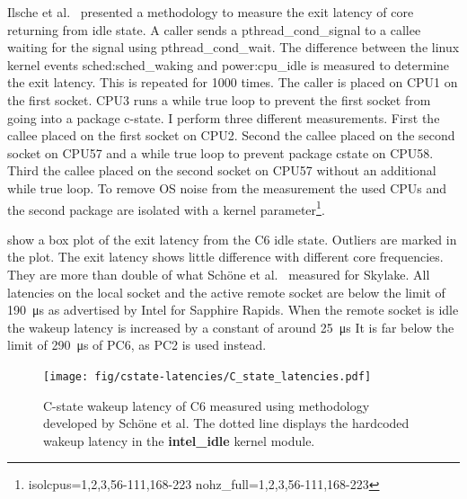 Ilsche et al.~\cite{Ilsche_2018_cstate} presented a methodology to measure the exit latency of core returning from idle state.
A caller sends a pthread\_cond\_signal to a callee waiting for the signal using pthread\_cond\_wait.
The difference between the linux kernel events sched:sched\_waking and power:cpu\_idle is measured to determine the exit latency.
This is repeated for \SI{1000}{} times.
The caller is placed on CPU1 on the first socket.
CPU3 runs a while true loop to prevent the first socket from going into a package c-state.
I perform three different measurements.
First the callee placed on the first socket on CPU2.
Second the callee placed on the second socket on CPU57 and a while true loop to prevent package cstate on CPU58.
Third the callee placed on the second socket on CPU57 without an additional while true loop.
To remove OS noise from the measurement the used CPUs and the second package are isolated with a kernel parameter\footnote{isolcpus=1,2,3,56-111,168-223 nohz\_full=1,2,3,56-111,168-223}.

 show a box plot of the exit latency from the C6 idle state.
Outliers are marked in the plot.
The exit latency shows little difference with different core frequencies.
They are more than double of what Schöne et al.~\cite{Schoene_2019_SKL} measured for Skylake.
All latencies on the local socket and the active remote socket are below the limit of \SI{190}{\us} as advertised by Intel for Sapphire Rapids.
When the remote socket is idle the wakeup latency is increased by a constant of around \SI{25}{\us}
It is far below the limit of \SI{290}{\us} of PC6, as PC2 is used instead.

\begin{figure}[!ht]
    \centering
    \texttt{[image: fig/cstate-latencies/C\_state\_latencies.pdf]}
    \caption{\label{fig:c6_latencies}C-state wakeup latency of C6 measured using methodology developed by Schöne et al.
The dotted line displays the hardcoded wakeup latency in the \protect\textbf{intel\_idle} kernel module.
\protect\footnotemark}
\end{figure}
